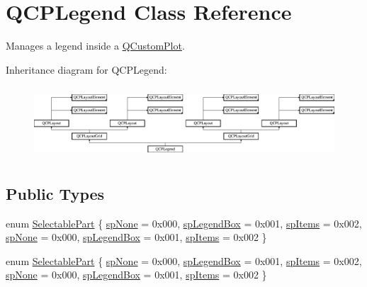 \hypertarget{class_q_c_p_legend}{}\section{Q\+C\+P\+Legend Class Reference}
\label{class_q_c_p_legend}


Manages a legend inside a \hyperlink{class_q_custom_plot}{Q\+Custom\+Plot}.  


Inheritance diagram for Q\+C\+P\+Legend\+:\begin{figure}[H]
\begin{center}
\leavevmode
\includegraphics[height=2.713178cm]{class_q_c_p_legend}
\end{center}
\end{figure}
\subsection*{Public Types}
\begin{DoxyCompactItemize}
\item 
enum \hyperlink{class_q_c_p_legend_a5404de8bc1e4a994ca4ae69e2c7072f1}{Selectable\+Part} \{ \newline
\hyperlink{class_q_c_p_legend_a5404de8bc1e4a994ca4ae69e2c7072f1ab65003bec12b3c809a6377b6f75849db}{sp\+None} = 0x000, 
\hyperlink{class_q_c_p_legend_a5404de8bc1e4a994ca4ae69e2c7072f1a8448bd6d8fab7ee36c81c4359a06bd4b}{sp\+Legend\+Box} = 0x001, 
\hyperlink{class_q_c_p_legend_a5404de8bc1e4a994ca4ae69e2c7072f1a6d2b2f5d7b7a5c8a08184f9a8bcbf048}{sp\+Items} = 0x002, 
\hyperlink{class_q_c_p_legend_a5404de8bc1e4a994ca4ae69e2c7072f1ab65003bec12b3c809a6377b6f75849db}{sp\+None} = 0x000, 
\newline
\hyperlink{class_q_c_p_legend_a5404de8bc1e4a994ca4ae69e2c7072f1a8448bd6d8fab7ee36c81c4359a06bd4b}{sp\+Legend\+Box} = 0x001, 
\hyperlink{class_q_c_p_legend_a5404de8bc1e4a994ca4ae69e2c7072f1a6d2b2f5d7b7a5c8a08184f9a8bcbf048}{sp\+Items} = 0x002
 \}
\item 
enum \hyperlink{class_q_c_p_legend_a5404de8bc1e4a994ca4ae69e2c7072f1}{Selectable\+Part} \{ \newline
\hyperlink{class_q_c_p_legend_a5404de8bc1e4a994ca4ae69e2c7072f1ab65003bec12b3c809a6377b6f75849db}{sp\+None} = 0x000, 
\hyperlink{class_q_c_p_legend_a5404de8bc1e4a994ca4ae69e2c7072f1a8448bd6d8fab7ee36c81c4359a06bd4b}{sp\+Legend\+Box} = 0x001, 
\hyperlink{class_q_c_p_legend_a5404de8bc1e4a994ca4ae69e2c7072f1a6d2b2f5d7b7a5c8a08184f9a8bcbf048}{sp\+Items} = 0x002, 
\hyperlink{class_q_c_p_legend_a5404de8bc1e4a994ca4ae69e2c7072f1ab65003bec12b3c809a6377b6f75849db}{sp\+None} = 0x000, 
\newline
\hyperlink{class_q_c_p_legend_a5404de8bc1e4a994ca4ae69e2c7072f1a8448bd6d8fab7ee36c81c4359a06bd4b}{sp\+Legend\+Box} = 0x001, 
\hyperlink{class_q_c_p_legend_a5404de8bc1e4a994ca4ae69e2c7072f1a6d2b2f5d7b7a5c8a08184f9a8bcbf048}{sp\+Items} = 0x002
 \}
\end{DoxyCompactItemize}
